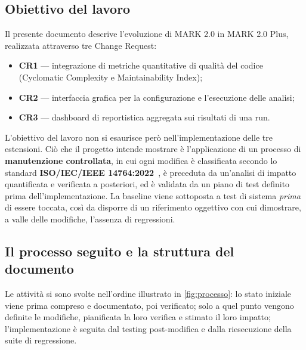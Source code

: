 \documentclass[11pt,a4paper]{article}
\newcommand{\projectName}{MARK 2.0 Plus}
\newcommand{\baselineName}{MARK 2.0}
\begin{document}
\subsection{Obiettivo del lavoro}
\label{sec:obiettivo}

Il presente documento descrive l'evoluzione di \baselineName{} in
\projectName{}, realizzata attraverso tre Change Request:

\begin{itemize}[nosep]
  \item \textbf{CR1} --- integrazione di metriche quantitative di qualit\`a del
    codice (Cyclomatic Complexity e Maintainability Index);
  \item \textbf{CR2} --- interfaccia grafica per la configurazione e
    l'esecuzione delle analisi;
  \item \textbf{CR3} --- dashboard di reportistica aggregata sui risultati di
    una run.
\end{itemize}

L'obiettivo del lavoro non si esaurisce per\`o nell'implementazione delle tre
estensioni. Ci\`o che il progetto intende mostrare \`e l'applicazione di un
processo di \textbf{manutenzione controllata}, in cui ogni modifica \`e
classificata secondo lo standard \textbf{ISO/IEC/IEEE 14764:2022}~\cite{iso14764},
\`e preceduta da un'analisi di impatto quantificata e verificata a posteriori,
ed \`e validata da un piano di test definito prima dell'implementazione. La
baseline viene sottoposta a test di sistema \emph{prima} di essere toccata,
cos\`i da disporre di un riferimento oggettivo con cui dimostrare, a valle delle
modifiche, l'assenza di regressioni.

\subsection{Il processo seguito e la struttura del documento}
\label{sec:processo}

Le attivit\`a si sono svolte nell'ordine illustrato in \cref{fig:processo}: lo
stato iniziale viene prima compreso e documentato, poi verificato; solo a quel
punto vengono definite le modifiche, pianificata la loro verifica e stimato il
loro impatto; l'implementazione \`e seguita dal testing post-modifica e dalla
riesecuzione della suite di regressione.
\end{document}

